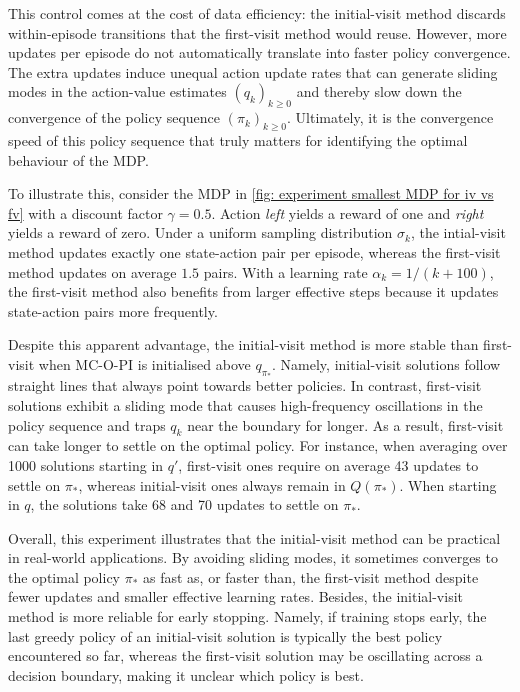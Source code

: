 \documentclass[twoside,11pt]{article}
\newcommand{\region}{\graval}
\newcommand{\pol}{\pi}
\newcommand{\qval}{q}
\newcommand{\qopt}{\qval_{\best{\pol}}}
\newcommand{\graval}{Q}
\newcommand{\discount}{\gamma}
\newcommand{\worst}[1]{\overline{#1}} %
\newcommand{\best}[1]{{#1}_*}
\DeclareRobustCommand{\reviewbarstart}{%
  \ifhmode %
    \vadjust{\vbox to 0pt{%
      \vskip-\ht\strutbox %
      \vskip-\dp\strutbox %
      \cbstart[\changebarwidth] %
      \vss %
    }}%
  \else %
    \cbstart[\changebarwidth]%
  \fi %
} %
\providecommand{\DIFadd}[1]{#1} %
\providecommand{\DIFaddbegin}{\reviewbarstart} %
\providecommand{\DIFaddend}{\protect\cbend} %
\def\DIFadd#1{#1}%
\def\DIFaddbegin{}%
\def\DIFaddend{}%
\begin{document}
This control comes at the cost of data efficiency: the initial-visit method discards within-episode transitions that the first-visit method would reuse. However, more updates per episode do not automatically translate into faster policy convergence.
The extra updates induce  \DIFaddbegin \DIFadd{unequal action update rates }\DIFaddend that can generate sliding modes in the action-value estimates $(q_k)_{k \ge 0}$ and thereby slow down the convergence of the policy sequence $(\pi_k)_{k \ge 0}$. Ultimately, it is the convergence speed of this policy sequence that truly matters for identifying the optimal behaviour of the MDP.

To illustrate this, consider the MDP in \autoref{fig: experiment smallest MDP for iv vs fv} with a discount factor $\discount = 0.5$. Action \textit{left} yields a reward of one and \textit{right} yields a reward of zero.
Under a uniform sampling distribution $\sigma_k$, the intial-visit method updates exactly one state-action pair per episode, whereas the first-visit method updates on average $1.5$ pairs.
With a learning rate $\alpha_k = 1/(k+100)$, the first-visit method also benefits from larger effective steps because it updates state-action pairs more frequently.


Despite this apparent advantage, the initial-visit method is more stable than first-visit when MC-O-PI is initialised above $\qopt$.
Namely, initial-visit solutions follow straight lines that always point towards better policies.
In contrast, first-visit solutions exhibit a sliding mode that causes high-frequency oscillations in the policy sequence and traps $q_k$ near the boundary for longer.
As a result, first-visit can take longer to settle on the optimal policy.
For instance, when averaging over 1000 solutions starting in $q'$, first-visit ones require on average 43 updates to settle on $\pi_*$, whereas initial-visit ones always remain in $\region(\best{\pi})$.
When starting in $q$, the solutions take 68 and 70 updates to settle on $\pi_*$.


Overall, this experiment illustrates that the initial-visit method can be practical in real-world applications. 
By avoiding sliding modes, it sometimes converges to the optimal policy $\best{\pi}$ as fast as, or faster than, the first-visit method despite fewer updates and smaller effective learning rates.
Besides, the initial-visit method is more reliable for early stopping. Namely, if training stops early, the last greedy policy of an initial-visit solution is typically the best policy encountered so far, whereas the first-visit solution may be oscillating across a decision boundary, making it unclear which policy is best.
\end{document}
